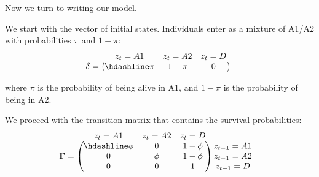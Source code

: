 \documentclass[
  12pt,
]{krantz}
\begin{document}
Now we turn to writing our model.

We start with the vector of initial states. Individuals enter as a mixture of A1/A2 with probabilities \(\pi\) and \(1-\pi\):
\[\begin{matrix}
& \\
\mathbf{\delta} =
  \left ( \vphantom{ \begin{matrix} 12 \end{matrix} } \right .
          \end{matrix}
          \hspace{-1.2em}
          \begin{matrix}
          z_t=A1 & z_t=A2 & z_t=D \\ \hdashline
          \pi & 1 - \pi & 0\\
          \end{matrix}
          \hspace{-0.2em}
          \begin{matrix}
          & \\
          \left . \vphantom{ \begin{matrix} 12 \end{matrix} } \right )
\begin{matrix}
\end{matrix}
\end{matrix}\]

where \(\pi\) is the probability of being alive in A1, and \(1 - \pi\) is the probability of being in A2.

We proceed with the transition matrix that contains the survival probabilities:
\[\begin{matrix}
& \\
\mathbf{\Gamma} =
  \left ( \vphantom{ \begin{matrix} 12 \\ 12 \\ 12 \end{matrix} } \right .
          \end{matrix}
          \hspace{-1.2em}
          \begin{matrix}
          z_t=A1 & z_t=A2 & z_t=D \\ \hdashline
          \phi  & 0 & 1 - \phi\\
          0 & \phi & 1 - \phi\\
          0 & 0 & 1
          \end{matrix}
          \hspace{-0.2em}
          \begin{matrix}
          & \\
          \left . \vphantom{ \begin{matrix} 12 \\ 12 \\ 12 \end{matrix} } \right )
\begin{matrix}
z_{t-1}=A1 \\ z_{t-1}=A2 \\ z_{t-1}=D
\end{matrix}
\end{matrix}\]
\end{document}
